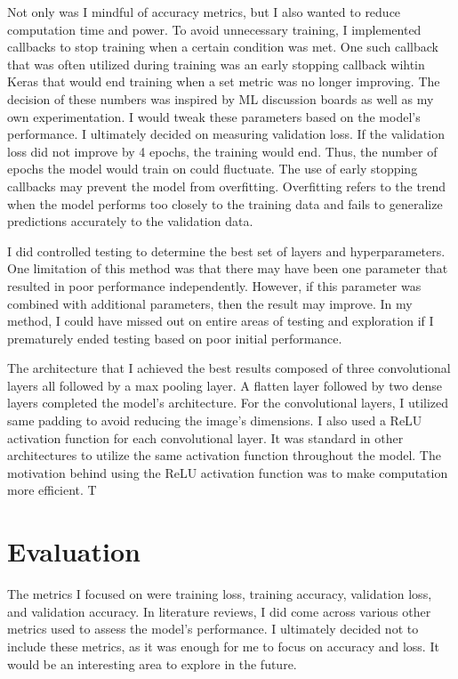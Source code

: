 \documentclass[10pt,twocolumn]{article}
\begin{document}
Not only was I mindful of accuracy metrics, but I also wanted to reduce computation time and power. To avoid unnecessary training, I implemented callbacks to stop training when a certain condition was met. One such callback that was often utilized during training was an early stopping callback wihtin Keras that would end training when a set metric was no longer improving. The decision of these numbers was inspired by ML discussion boards as well as my own experimentation. I would tweak these parameters based on the model's performance. I ultimately decided on measuring validation loss. If the validation loss did not improve by 4 epochs, the training would end. Thus, the number of epochs the model would train on could fluctuate. The use of early stopping callbacks may prevent the model from overfitting. Overfitting refers to the trend when the model performs too closely to the training data and fails to generalize predictions accurately to the validation data. 

I did controlled testing to determine the best set of layers and hyperparameters. One limitation of this method was that there may have been one parameter that resulted in poor performance independently. However, if this parameter was combined with additional parameters, then the result may improve. In my method, I could have missed out on entire areas of testing and exploration if I prematurely ended testing based on poor initial performance. 

The architecture that I achieved the best results composed of three convolutional layers all followed by a max pooling layer. A flatten layer followed by two dense layers completed the model’s architecture. For the convolutional layers, I utilized same padding to avoid reducing the image’s dimensions. I also used a ReLU activation function for each convolutional layer. It was standard in other architectures to utilize the same activation function throughout the model. The motivation behind using the ReLU activation function was to make computation more efficient. T

\section{Evaluation}
The metrics I focused on were training loss, training accuracy, validation loss, and validation accuracy. In literature reviews, I did come across various other metrics used to assess the model’s performance. I ultimately decided not to include these metrics, as it was enough for me to focus on accuracy and loss. It would be an interesting area to explore in the future.  
\end{document}
